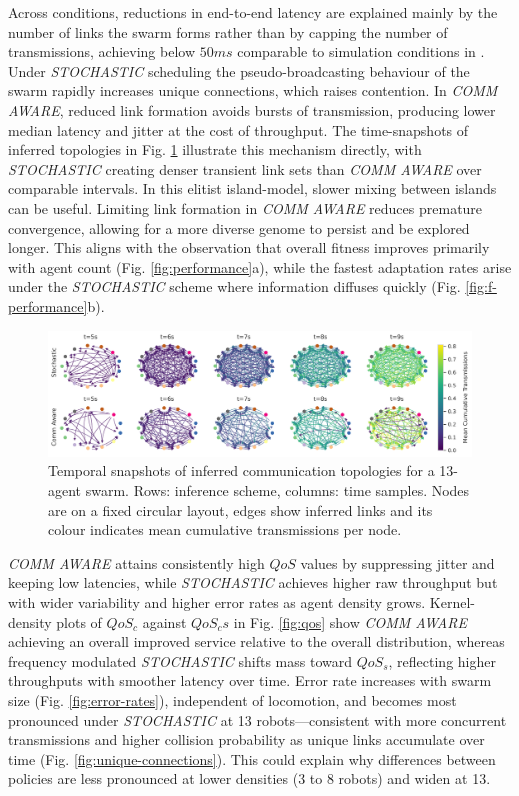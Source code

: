 \documentclass[conference]{IEEEtran}
\begin{document}
Across conditions, reductions in end-to-end latency are explained mainly by the number of links the swarm forms rather than by capping the number of transmissions, achieving below $50ms$ comparable to simulation conditions in \cite{hauert_evolved_2009}. Under \emph{STOCHASTIC} scheduling the pseudo-broadcasting behaviour of the swarm rapidly increases unique connections, which raises contention. In \emph{COMM AWARE}, reduced link formation avoids bursts of transmission, producing lower median latency and jitter at the cost of throughput. The time-snapshots of inferred topologies in Fig. \ref{fig:convergence} illustrate this mechanism directly, with \emph{STOCHASTIC} creating denser transient link sets than \emph{COMM AWARE} over comparable intervals. In this elitist island-model, slower mixing between islands can be useful. Limiting link formation in \emph{COMM AWARE} reduces premature convergence, allowing for a more diverse genome to persist and be explored longer. This aligns with the observation that overall fitness improves primarily with agent count (Fig. \ref{fig:performance}a), while the fastest adaptation rates arise under the \emph{STOCHASTIC} scheme where information diffuses quickly (Fig. \ref{fig:f-performance}b).\\

\begin{figure}[h]
    \centering
    \includegraphics[width=1\textwidth]{convergence_impact.pdf}
    \caption{Temporal snapshots of inferred communication topologies for a 13-agent swarm. Rows: inference scheme, columns: time samples. Nodes are on a fixed circular layout, edges show inferred links and its colour indicates mean cumulative transmissions per node.}
    \label{fig:convergence}
\end{figure}

\emph{COMM AWARE} attains consistently high $QoS$ values by suppressing jitter and keeping low latencies, while \emph{STOCHASTIC} achieves higher raw throughput but with wider variability and higher error rates as agent density grows. Kernel-density plots of $QoS_c$ against $QoS_cs$ in Fig. \ref{fig:qos} show \emph{COMM AWARE} achieving an overall improved service relative to the overall distribution, whereas frequency modulated \emph{STOCHASTIC} shifts mass toward $QoS_s$, reflecting higher throughputs with smoother latency over time.
Error rate increases with swarm size (Fig. \ref{fig:error-rates}), independent of locomotion, and becomes most pronounced under \emph{STOCHASTIC} at 13 robots—consistent with more concurrent transmissions and higher collision probability as unique links accumulate over time (Fig. \ref{fig:unique-connections}). This could explain why differences between policies are less pronounced at lower densities (3 to 8 robots) and widen at 13.\\
\end{document}
